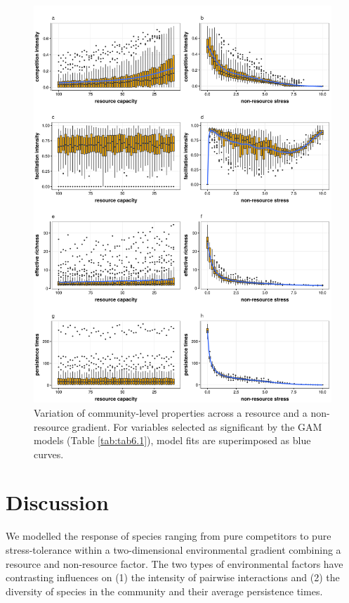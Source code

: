 \begin{figure}[ht]
\includegraphics[width=\textwidth]{./Figures/chapter06/Fig_2.png}
\caption[Community responses to gradients]{\color{Gray} Variation of community-level properties across a resource and a non-resource gradient. For variables selected as significant by the GAM models (Table \ref{tab:tab6.1}), model fits are superimposed as blue curves.}
\label{fig:fig6.2}
\end{figure}

\section{Discussion}

We modelled the response of species ranging from pure competitors to pure stress-tolerance within a two-dimensional environmental gradient combining a resource and non-resource factor. The two types of environmental factors have contrasting influences on (1) the intensity of pairwise interactions and (2) the diversity of species in the community and their average persistence times.

